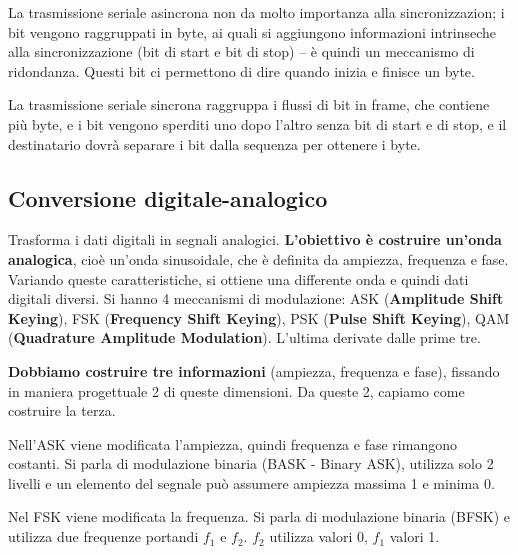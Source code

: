             \vspace{3mm}
            
            La trasmissione seriale asincrona non da molto importanza alla sincronizzazion; i bit vengono raggruppati in byte, ai quali si aggiungono informazioni intrinseche alla sincronizzazione (bit di start e bit di stop) -- è quindi un meccanismo di ridondanza. Questi bit ci permettono di dire quando inizia e finisce un byte. 
            
            \vspace{3mm}
            
            La trasmissione seriale sincrona raggruppa i flussi di bit in frame, che contiene più byte, e i bit vengono sperditi uno dopo l'altro senza bit di start e di stop, e il destinatario dovrà separare i bit dalla sequenza per ottenere i byte.
    
    \subsection{Conversione digitale-analogico}
    
        Trasforma i dati digitali in segnali analogici. \textbf{L'obiettivo è costruire un'onda analogica}, cioè un'onda sinusoidale, che è definita da ampiezza, frequenza e fase. Variando queste caratteristiche, si ottiene una differente onda e quindi dati digitali diversi. Si hanno 4 meccanismi di modulazione: ASK (\textbf{Amplitude Shift Keying}), FSK (\textbf{Frequency Shift Keying}), PSK (\textbf{Pulse Shift Keying}), QAM (\textbf{Quadrature Amplitude Modulation}). L'ultima derivate dalle prime tre.
        
        \vspace{3mm}
        
        \textbf{Dobbiamo costruire tre informazioni} (ampiezza, frequenza e fase), fissando in maniera progettuale 2 di queste dimensioni. Da queste 2, capiamo come costruire la terza. 
        
        \vspace{3mm}
        
        Nell'ASK viene modificata l'ampiezza, quindi frequenza e fase rimangono costanti. Si parla di modulazione binaria (BASK - Binary ASK), utilizza solo 2 livelli e un elemento del segnale può assumere ampiezza massima 1 e minima 0.
        
        \vspace{3mm}
        
        Nel FSK viene modificata la frequenza. Si parla di modulazione binaria (BFSK) e utilizza due frequenze portandi $f_1$ e $f_2$. $f_2$ utilizza valori 0, $f_1$ valori 1.
        
